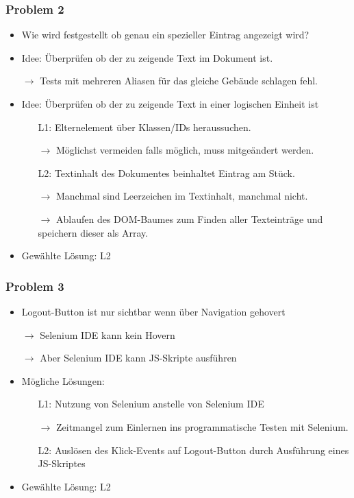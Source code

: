\begin{frame}\frametitle{Problem 2}
    \begin{itemize}
        \item Wie wird festgestellt ob genau ein spezieller Eintrag angezeigt wird?
        \item Idee: Überprüfen ob der zu zeigende Text im Dokument ist.
        \item[$\rightarrow$] Tests mit mehreren Aliasen für das gleiche Gebäude schlagen fehl.
        \item Idee: Überprüfen ob der zu zeigende Text in einer logischen Einheit ist \begin{itemize}
            \item[L1:] Elternelement über Klassen/IDs heraussuchen.
            \item[$\rightarrow$] Möglichst vermeiden falls möglich, muss mitgeändert werden.
            \item[L2:]Textinhalt des Dokumentes beinhaltet Eintrag am Stück.
            \item[$\rightarrow$] Manchmal sind Leerzeichen im Textinhalt, manchmal nicht.
            \item[$\rightarrow$] Ablaufen des DOM-Baumes zum Finden aller Texteinträge und speichern dieser als Array.
        \end{itemize} 
        \pause
        \item Gewählte Lösung: L2
    \end{itemize}
\end{frame}

\begin{frame}\frametitle{Problem 3}
    \begin{itemize}
        \item Logout-Button ist nur sichtbar wenn über Navigation gehovert
        \item[$\rightarrow$] Selenium IDE kann kein Hovern
        \item[$\rightarrow$] Aber Selenium IDE kann JS-Skripte ausführen
        \item Mögliche Lösungen: \begin{itemize}
            \item[L1:] Nutzung von Selenium anstelle von Selenium IDE
            \item[$\rightarrow$] Zeitmangel zum Einlernen ins programmatische Testen mit Selenium.
            \item[L2:] Auslösen des Klick-Events auf Logout-Button durch Ausführung eines JS-Skriptes 
        \end{itemize}
        \pause
        \item Gewählte Lösung: L2
    \end{itemize}
\end{frame}

